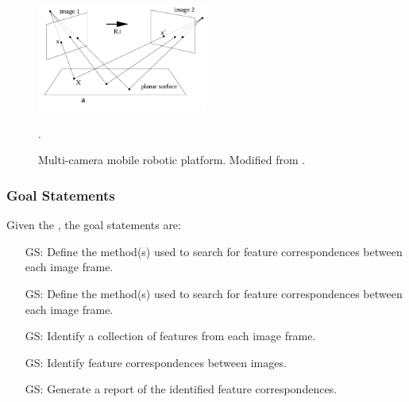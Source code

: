 \documentclass[12pt]{article}
\newcounter{goalnum} %
\begin{document}
\begin{figure}[ht!]
  \begin{center}
  \centering\includegraphics[width=0.5\textwidth]{Images/MULTIVIEW.png}
  \caption{Multi-camera mobile robotic platform. 
  Modified from \cite{Hartley_Zisserman}.}.
  \label{MV_HZ}
  \end{center}
\end{figure}






\subsubsection{Goal Statements}


\noindent Given the , the goal statements are:

\begin{itemize}

  \item[GS\refstepcounter{goalnum}\thegoalnum \label{define_features}:]
    Define the method(s) used to search for feature correspondences between each image frame.
    
  \item[GS\refstepcounter{goalnum}\thegoalnum \label{compare_features}:]
    Define the method(s) used to search for feature correspondences between each image frame.
  
  \item[GS\refstepcounter{goalnum}\thegoalnum \label{identify_features}:]
    Identify a collection of features from each image frame. 
  
  \item[GS\refstepcounter{goalnum}\thegoalnum \label{identify_matches}:] 
    Identify feature correspondences between images.
  
  \item[GS\refstepcounter{goalnum}\thegoalnum \label{report_matches}:]
    Generate a report of the identified feature correspondences.
    
\end{itemize}
\end{document}
